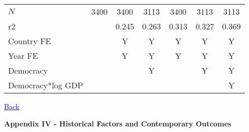 \documentclass[10pt,letterpaper,subeqn]{beamer}
\begin{document}
\begin{frame}[label=RightsComp]
\begin{table}[htbp]
{\begin{tabular}{l*{6}{c}}
\hline
\(N\)       &        3400         &        3400         &        3113         &        3400         &        3113         &        3113         \\
r2          &                     &       0.245         &       0.263         &       0.313         &       0.327         &       0.369         \\
\hline
Country FE        &                     &    Y                 &      Y               &     Y         &           Y          &     Y         \\
Year FE            &                     &    Y                 &      Y               &     Y         &           Y          &     Y         \\
Democracy       &                     &                     &     Y &                     &      Y  &      Y\\
Democracy*log GDP   &                     &                     &                     &                     &                     &      Y\\

\hline
\end{tabular}}
\end{table}
\hyperlink{Rights}{\textcolor{blue}{Back}}
\end{frame}

\begin{frame}[plain]
\begin{center}
\textbf{Appendix IV - Historical Factors and Contemporary Outcomes}
\end{center}
\end{frame}
\end{document}
